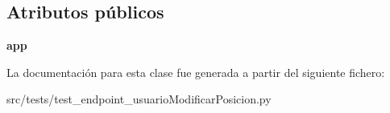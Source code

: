 \subsection*{Atributos públicos}
\begin{DoxyCompactItemize}
\item 
\hypertarget{classsrc_1_1tests_1_1test__endpoint__usuario_modificar_posicion_1_1_test_endpoint_usuario_modificar_posicion_a85ac373b692b41dd1d8c54b4d8ebaeea}{{\bfseries app}}\label{classsrc_1_1tests_1_1test__endpoint__usuario_modificar_posicion_1_1_test_endpoint_usuario_modificar_posicion_a85ac373b692b41dd1d8c54b4d8ebaeea}

\end{DoxyCompactItemize}


La documentación para esta clase fue generada a partir del siguiente fichero\-:\begin{DoxyCompactItemize}
\item 
src/tests/test\-\_\-endpoint\-\_\-usuario\-Modificar\-Posicion.\-py\end{DoxyCompactItemize}
